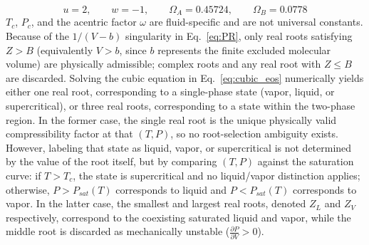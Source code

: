 \documentclass{article}
\begin{document}
\[
u = 2, \qquad w = -1, \qquad \Omega_A = 0.45724, \qquad \Omega_B = 0.0778
\]
$T_c$, $P_c$, and the acentric factor $\omega$ are fluid-specific and are not universal constants.
Because of the $1/(V-b)$ singularity in Eq.~\eqref{eq:PR}, only real roots satisfying $Z>B$ (equivalently $V>b$, since $b$ represents the finite excluded molecular volume) are physically admissible; complex roots and any real root with $Z \le B$ are discarded. Solving the cubic equation in Eq.~\eqref{eq:cubic_eos} numerically yields either one real root, corresponding to a single-phase state (vapor, liquid, or supercritical), or three real roots, corresponding to a state within the two-phase region. In the former case, the single real root is the unique physically valid compressibility factor at that $(T,P)$, so no root-selection ambiguity exists. However, labeling that state as liquid, vapor, or supercritical is not determined by the value of the root itself, but by comparing $(T,P)$ against the saturation curve: if $T>T_c$, the state is supercritical and no liquid/vapor distinction applies; otherwise, $P>P_{sat}(T)$ corresponds to liquid and $P<P_{sat}(T)$ corresponds to vapor. In the latter case, the smallest and largest real roots, denoted $Z_L$ and $Z_V$ respectively, correspond to the coexisting saturated liquid and vapor, while the middle root is discarded as mechanically unstable ($\frac{\partial P}{\partial V}>0$).
\end{document}
